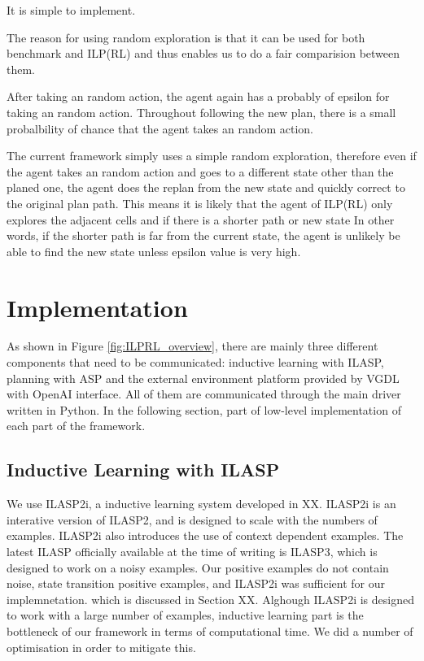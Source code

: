 It is simple to implement.

The reason for using random exploration is that it can be used for both benchmark and ILP(RL) and thus enables us to do a fair comparision between them.

After taking an random action, the agent again has a probably of epsilon for taking an random action. 
Throughout following the new plan, there is a small probalbility of chance that the agent takes an random action.

The current framework simply uses a simple random exploration, therefore even if the agent takes an random action and goes to a different state other than the planed one, 
the agent does the replan from the new state and quickly correct to the original plan path. 
This means it is likely that the agent of ILP(RL) only explores the adjacent cells and if there is a shorter path or new state
In other words, if the shorter path is far from the current state, the agent is unlikely be able to find the new state unless epsilon value is very high. 

\section{Implementation}
\label{Implementation}

As shown in Figure \ref{fig:ILPRL_overview}, there are mainly three different components that need to be communicated: inductive learning with ILASP, planning with ASP and the external environment platform provided by VGDL with OpenAI interface.
All of them are communicated through the main driver written in Python. 
In the following section, part of low-level implementation of each part of the framework.


\subsection{Inductive Learning with ILASP}
We use ILASP2i, a inductive learning system developed in XX. 
ILASP2i is an interative version of ILASP2, and is designed to scale with the numbers of examples. 
ILASP2i also introduces the use of context dependent examples.
The latest ILASP officially available at the time of writing is ILASP3, which is designed to work on a noisy examples. 
Our positive examples do not contain noise, state transition positive examples, and ILASP2i was sufficient for our implemnetation.
which is discussed in Section XX. 
Alghough ILASP2i is designed to work with a large number of examples, inductive learning part is the bottleneck of our framework in terms of computational time. 
We did a number of optimisation in order to mitigate this. 

